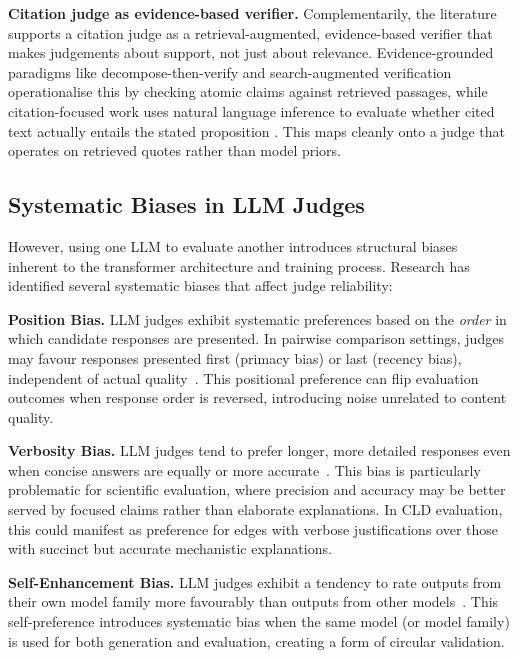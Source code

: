 \textbf{Citation judge as evidence-based verifier.} Complementarily, the literature supports a citation judge as a retrieval-augmented, evidence-based verifier that makes judgements about support, not just about relevance. Evidence-grounded paradigms like decompose-then-verify \citep{min2023factscore} and search-augmented verification \citep{wei2024longform} operationalise this by checking atomic claims against retrieved passages, while citation-focused work uses natural language inference to evaluate whether cited text actually entails the stated proposition \citep{gao2023enabling}. This maps cleanly onto a judge that operates on retrieved quotes rather than model priors.

\subsection{Systematic Biases in LLM Judges}

However, using one LLM to evaluate another introduces structural biases inherent to the transformer architecture and training process. Research has identified several systematic biases that affect judge reliability:

\textbf{Position Bias.} LLM judges exhibit systematic preferences based on the \textit{order} in which candidate responses are presented. In pairwise comparison settings, judges may favour responses presented first (primacy bias) or last (recency bias), independent of actual quality~\citep{zheng2024judging}. This positional preference can flip evaluation outcomes when response order is reversed, introducing noise unrelated to content quality.

\textbf{Verbosity Bias.} LLM judges tend to prefer longer, more detailed responses even when concise answers are equally or more accurate~\citep{zheng2024judging, li2024llmsjudges}. This bias is particularly problematic for scientific evaluation, where precision and accuracy may be better served by focused claims rather than elaborate explanations. In CLD evaluation, this could manifest as preference for edges with verbose justifications over those with succinct but accurate mechanistic explanations.

\textbf{Self-Enhancement Bias.} LLM judges exhibit a tendency to rate outputs from their own model family more favourably than outputs from other models~\citep{li2024llmsjudges}. This self-preference introduces systematic bias when the same model (or model family) is used for both generation and evaluation, creating a form of circular validation.

